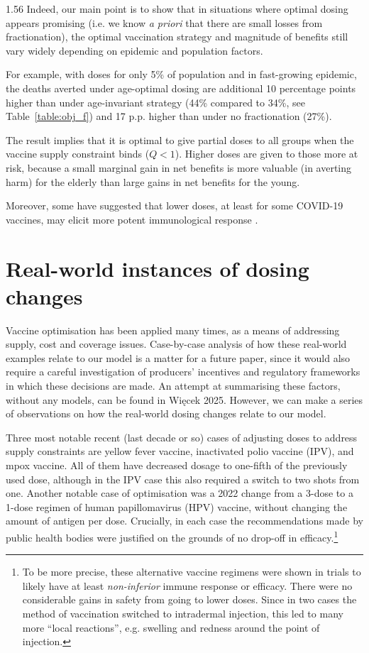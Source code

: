 \documentclass[12pt]{article}
\begin{document}
\begin{spacing}{1.56}
Indeed, our main point is to show that in situations where optimal dosing appears promising (i.e. we know \textit{a priori} that there are small losses from fractionation), the optimal vaccination strategy and magnitude of benefits still vary widely depending on epidemic and population factors. 


For example, with doses for only 5\% of population and in fast-growing epidemic, the deaths averted under age-optimal dosing are additional 10 percentage points higher than under age-invariant strategy (44\% compared to 34\%, see Table~\ref{table:obj_f}) and 17 p.p. higher than under no fractionation (27\%). 


The result implies that it is optimal to give partial doses to all groups when the vaccine supply constraint binds ($Q<1$). Higher doses are given to those more at risk, because a small marginal gain in net benefits is more valuable (in averting harm) for the elderly than large gains in net benefits for the young. 

Moreover, some have suggested that lower doses, at least for some COVID-19 vaccines, may elicit more potent immunological response \cite{sanchez_limiting_2021}.

\pagebreak

\section{Real-world instances of dosing changes}

Vaccine optimisation has been applied many times, as a means of addressing supply, cost and coverage issues. Case-by-case analysis of how these real-world examples relate to our model is a matter for a future paper, since it would also require a careful investigation of producers' incentives and regulatory frameworks in which these decisions are made. An attempt at summarising these factors, without any models, can be found in Więcek 2025. However, we can make a series of observations on how the real-world dosing changes relate to our model.

Three most notable recent (last decade or so) cases of adjusting doses to address supply constraints are yellow fever vaccine, inactivated polio vaccine (IPV), and mpox vaccine. All of them have decreased dosage to one-fifth of the previously used dose, although in the IPV case this also required a switch to two shots from one. Another notable case of optimisation was a 2022 change from a 3-dose to a 1-dose regimen of human papillomavirus (HPV) vaccine, without changing the amount of antigen per dose. Crucially, in each case the recommendations made by public health bodies were justified on the grounds of no drop-off in efficacy.\footnote{To be more precise, these alternative vaccine regimens were shown in trials to likely have at least {\em non-inferior} immune response or efficacy. There were no considerable gains in safety from going to lower doses. Since in two cases the method of vaccination switched to intradermal injection, this led to many more ``local reactions'', e.g. swelling and redness around the point of injection.} 


\end{spacing}
\end{document}
